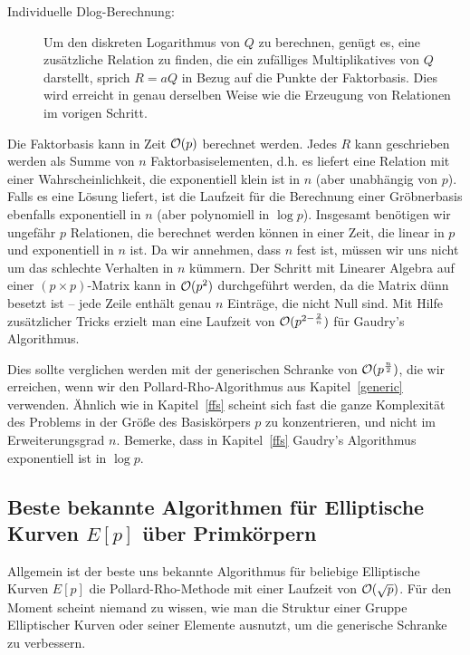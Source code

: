 \begin{refsegment}
\begin{description}
\item[Individuelle Dlog-Berechnung:] Um den diskreten Logarithmus von $Q$ zu berechnen, genügt es, eine zusätzliche Relation zu finden, die ein zufälliges Multiplikatives von $Q$ darstellt, sprich $R=aQ$ in Bezug auf die Punkte der Faktorbasis. Dies wird erreicht in genau derselben Weise wie die Erzeugung von Relationen im vorigen Schritt.
\end{description}


Die Faktorbasis kann in Zeit ${\cal O}(p)$ berechnet werden. Jedes $R$ kann geschrieben werden als Summe von $n$ Faktorbasiselementen, d.h. es liefert eine Relation mit einer Wahrscheinlichkeit, die exponentiell klein ist in $n$ (aber unabhängig von $p$). Falls es eine Lösung liefert, ist die Laufzeit für die Berechnung einer Gröbnerbasis ebenfalls exponentiell in $n$ (aber polynomiell in $\log p$). Insgesamt benötigen wir ungefähr $p$ Relationen, die berechnet werden können in einer Zeit, die linear in $p$ und exponentiell in $n$ ist. Da wir annehmen, dass $n$ fest ist, müssen wir uns nicht um das schlechte Verhalten in $n$ kümmern. Der Schritt mit Linearer Algebra auf einer $(p \times p)$-Matrix kann in ${\cal O}(p^2)$ durchgeführt werden, da die Matrix dünn besetzt ist -- jede Zeile enthält genau $n$ Einträge, die nicht Null sind. Mit Hilfe zusätzlicher Tricks erzielt man eine Laufzeit von ${\cal O}(p^{2-\frac 2 n})$ für Gaudry's Algorithmus.

Dies sollte verglichen werden mit der generischen Schranke von ${\cal O}(p^{\frac n 2})$, die wir erreichen, wenn wir den Pollard-Rho-Algorithmus aus Kapitel~\ref{generic} verwenden. Ähnlich wie in Kapitel~\ref{ffs} scheint sich fast die ganze Komplexität des Problems in der Größe des Basiskörpers $p$ zu konzentrieren, und nicht im Erweiterungsgrad $n$. Bemerke, dass in Kapitel~\ref{ffs} Gaudry's Algorithmus exponentiell ist in $\log p$.



\subsection{\texorpdfstring{Beste bekannte Algorithmen für Elliptische Kurven $E[p]$ über Primkörpern}{Beste bekannte Algorithmen für Elliptische Kurven E[p] über Primkörpern}}

Allgemein ist der beste uns bekannte Algorithmus für beliebige Elliptische Kurven $E[p]$ die Pollard-Rho-Methode mit einer Laufzeit von ${\cal O}(\sqrt p)$. Für den Moment scheint niemand zu wissen, wie man die Struktur einer Gruppe Elliptischer Kurven oder seiner Elemente ausnutzt, um die generische Schranke zu verbessern.


\end{refsegment}
